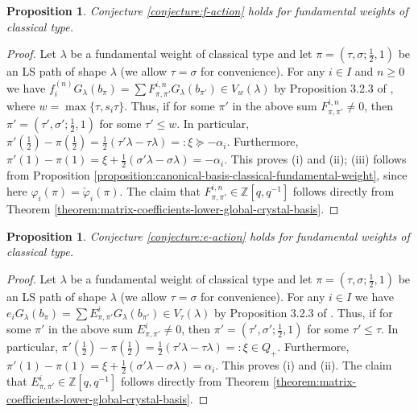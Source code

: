 \documentclass[final]{amsart}
\theoremstyle{plain}
\newtheorem{proposition}[corollary]{Proposition}
\theoremstyle{definition}
\newcommand{\bbZ}{\mathbb Z}
\newcommand{\cphi}{\check{\varphi}}
\begin{document}
\begin{proposition}
    \label{proposition:conjecture-classical-fundamental-weight}
    Conjecture \ref{conjecture:f-action} holds for fundamental weights of classical type.
\end{proposition}
\begin{proof}
    Let $\lambda$ be a fundamental weight of classical type and let $\pi = (\tau, \sigma; \frac12, 1)$ be an LS path of shape $\lambda$ (we allow $\tau = \sigma$ for convenience).
    For any $i \in I$ and $n \ge 0$ we have $f_i^{(n)} G_\lambda(b_\pi) = \sum F_{\pi,\pi'}^{i,n} G_\lambda(b_{\pi'}) \in V_w(\lambda)$ by Proposition 3.2.3 of \cite{Kashiwara:CrystalBase-Littelmann-DemazureCharacterFormula}, where $w = \max\{\tau, s_i\tau\}$.
    Thus, if for some $\pi'$ in the above sum $F_{\pi,\pi'}^{i,n} \neq 0$, then $\pi' = (\tau', \sigma'; \frac12, 1)$ for some $\tau' \le w$.
    In particular, $\pi'(\frac12) - \pi(\frac12) = \frac12(\tau'\lambda - \tau\lambda) =: \xi \succeq -\alpha_i$.
    Furthermore, $\pi'(1) - \pi(1) = \xi + \frac12(\sigma'\lambda - \sigma\lambda) = -\alpha_i$.
    This proves (i) and (ii); (iii) follows from Proposition \ref{proposition:canonical-basis-classical-fundamental-weight}, since here $\varphi_i(\pi) = \cphi_i(\pi)$.
    The claim that $F_{\pi,\pi'}^{i,n} \in \bbZ[q, q^{-1}]$ follows directly from Theorem \ref{theorem:matrix-coefficients-lower-global-crystal-basis}.
\end{proof}

\begin{proposition}
    \label{proposition:conjecture-e-action-classical-fundamental-weight}
    Conjecture \ref{conjecture:e-action} holds for fundamental weights of classical type.
\end{proposition}
\begin{proof}
    Let $\lambda$ be a fundamental weight of classical type and let $\pi = (\tau, \sigma; \frac12, 1)$ be an LS path of shape $\lambda$ (we allow $\tau = \sigma$ for convenience).
    For any $i \in I$ we have $e_i G_\lambda(b_\pi) = \sum E_{\pi,\pi'}^i G_\lambda(b_{\pi'}) \in V_\tau(\lambda)$ by Proposition 3.2.3 of \cite{Kashiwara:CrystalBase-Littelmann-DemazureCharacterFormula}.
    Thus, if for some $\pi'$ in the above sum $E_{\pi,\pi'}^i \neq 0$, then $\pi' = (\tau', \sigma'; \frac12, 1)$ for some $\tau' \le \tau$.
    In particular, $\pi'(\frac12) - \pi(\frac12) = \frac12(\tau'\lambda - \tau\lambda) =: \xi \in Q_+$.
    Furthermore, $\pi'(1) - \pi(1) = \xi + \frac12(\sigma'\lambda - \sigma\lambda) = \alpha_i$.
    This proves (i) and (ii).
    The claim that $E_{\pi,\pi'}^i \in \bbZ[q, q^{-1}]$ follows directly from Theorem \ref{theorem:matrix-coefficients-lower-global-crystal-basis}.
\end{proof}
\end{document}
